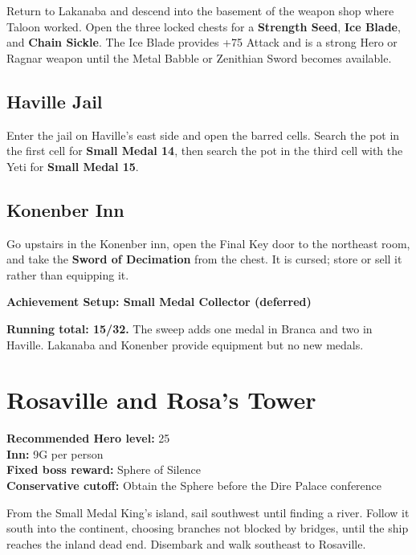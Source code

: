 \documentclass[
  american,
  10pt,
  letterpaper,
  oneside,
  open=any]{scrreprt}
\begin{document}
Return to Lakanaba and descend into the basement of the weapon shop
where Taloon worked. Open the three locked chests for a \textbf{Strength
Seed}, \textbf{Ice Blade}, and \textbf{Chain Sickle}. The Ice Blade
provides +75 Attack and is a strong Hero or Ragnar weapon until the
Metal Babble or Zenithian Sword becomes available.

\subsection{Haville Jail}\label{haville-jail}

Enter the jail on Haville's east side and open the barred cells. Search
the pot in the first cell for \textbf{Small Medal 14}, then search the
pot in the third cell with the Yeti for \textbf{Small Medal 15}.

\subsection{Konenber Inn}\label{konenber-inn}

Go upstairs in the Konenber inn, open the Final Key door to the
northeast room, and take the \textbf{Sword of Decimation} from the
chest. It is cursed; store or sell it rather than equipping it.

\begin{achievementsetup}

\textbf{Achievement Setup: Small Medal Collector (deferred)}

\textbf{Running total: 15/32.} The sweep adds one medal in Branca and
two in Haville. Lakanaba and Konenber provide equipment but no new
medals.

\end{achievementsetup}

\section{Rosaville and Rosa's Tower}\label{rosaville-and-rosas-tower}

\textbf{Recommended Hero level:} 25\\
\textbf{Inn:} 9G per person\\
\textbf{Fixed boss reward:} Sphere of Silence\\
\textbf{Conservative cutoff:} Obtain the Sphere before the Dire Palace
conference

From the Small Medal King's island, sail southwest until finding a
river. Follow it south into the continent, choosing branches not blocked
by bridges, until the ship reaches the inland dead end. Disembark and
walk southeast to Rosaville.
\end{document}
